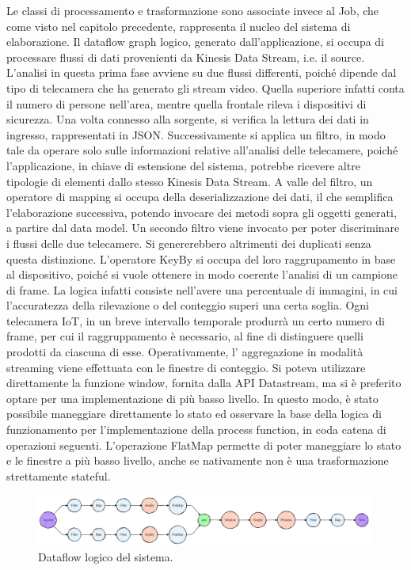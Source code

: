 Le classi di processamento e trasformazione sono associate invece al Job, che come visto nel capitolo precedente, rappresenta il nucleo del sistema di elaborazione. Il dataflow graph logico, generato dall'applicazione, si occupa di processare flussi di dati provenienti da Kinesis Data Stream, i.e. il source. L'analisi in questa prima fase avviene su due flussi differenti, poiché  dipende dal tipo di telecamera che ha generato gli stream video. Quella superiore infatti conta il numero di persone nell'area, mentre quella frontale rileva i dispositivi di sicurezza. Una volta connesso alla sorgente, si verifica la lettura dei dati in ingresso, rappresentati in JSON. Successivamente si applica un filtro, in modo tale da operare solo sulle informazioni relative all'analisi delle telecamere, poiché l'applicazione, in chiave di estensione del sistema, potrebbe ricevere altre tipologie di elementi dallo stesso Kinesis Data Stream. A valle del filtro, un operatore di mapping si occupa della deserializzazione dei dati, il che semplifica l'elaborazione successiva, potendo invocare dei metodi sopra gli oggetti generati, a partire dal data model. Un secondo filtro viene invocato per poter discriminare i flussi delle due telecamere. Si genererebbero altrimenti dei duplicati senza questa distinzione. L'operatore KeyBy si occupa del loro raggrupamento in base al dispositivo, poiché si vuole ottenere in modo coerente l'analisi di un campione di frame. La logica infatti consiste nell'avere una percentuale di immagini, in cui l'accuratezza della rilevazione o del conteggio superi una certa soglia. Ogni telecamera IoT, in un breve intervallo temporale produrrà un certo numero di frame, per cui il raggruppamento è necessario, al fine di distinguere quelli prodotti da ciascuna di esse. Operativamente, l' aggregazione in modalità streaming viene effettuata con le finestre di conteggio. Si poteva utilizzare direttamente la funzione window, fornita dalla API Datastream, ma si è preferito optare per una implementazione di più basso livello. In questo modo, è stato possibile maneggiare direttamente lo stato ed osservare la base della logica di funzionamento per l'implementazione della process function, in coda catena di operazioni seguenti. L'operazione FlatMap permette di poter maneggiare lo stato e le finestre a più basso livello, anche se nativamente non è una trasformazione strettamente stateful. 

\vspace{0.5cm}
\begin{figure}[htbp]
    \centering
    \includegraphics[width=0.99\textwidth]{figures/system-logical-dataflow-graph.png}
    \caption{Dataflow logico del sistema.} 
    \label{fig:system-dataflow}
\end{figure}

